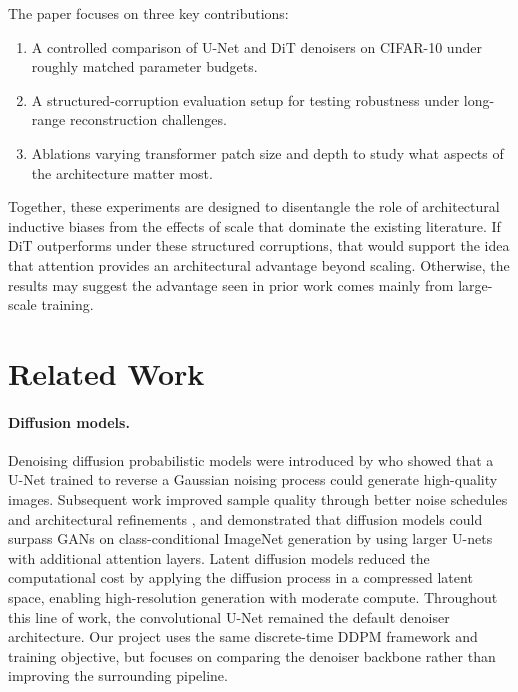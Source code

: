 \documentclass{article}
\begin{document}
The paper focuses on three key contributions:
\begin{enumerate}
    \item A controlled comparison of U-Net and DiT denoisers on CIFAR-10 under roughly matched parameter budgets.
    \item A structured-corruption evaluation setup for testing robustness under long-range reconstruction challenges.
    \item Ablations varying transformer patch size and depth to study what aspects of the architecture matter most.
\end{enumerate}

Together, these experiments are designed to disentangle the role of architectural inductive biases from the effects of scale that dominate the existing literature. If DiT outperforms under these structured corruptions, that would support the idea that attention provides an architectural advantage beyond scaling. Otherwise, the results may suggest the advantage seen in prior work comes mainly from large-scale training.

\section{Related Work}
\label{sec:related}

\paragraph{Diffusion models.}
Denoising diffusion probabilistic models were introduced by \citet{ho2020ddpm} who showed that a U-Net trained to reverse a Gaussian noising process could generate high-quality images.
Subsequent work improved sample quality through better noise schedules and architectural refinements \citep{nichol2021improved}, and \citet{dhariwal2021diffusionbeat} demonstrated that diffusion models could surpass GANs on class-conditional ImageNet generation by using larger U-nets with additional attention layers.
Latent diffusion models \citep{rombach2022ldm} reduced the computational cost by applying the diffusion process in a compressed latent space, enabling high-resolution generation with moderate compute.
Throughout this line of work, the convolutional U-Net remained the default denoiser architecture.
Our project uses the same discrete-time DDPM framework and training objective, but focuses on comparing the denoiser backbone rather than improving the surrounding pipeline.
\end{document}
